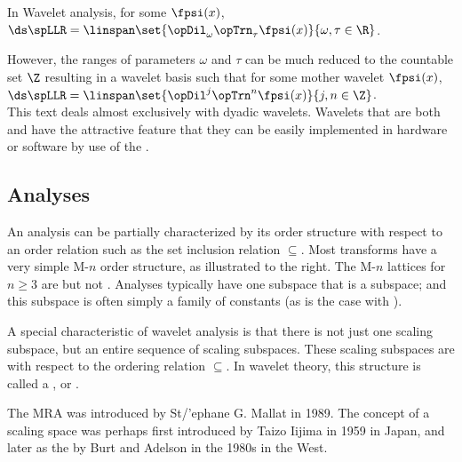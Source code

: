 In Wavelet analysis, for some   $\fpsi(x)$,
  \\\indentx$\ds\spLLR=\linspan\set{\opDil_\omega\opTrn_\tau \fpsi(x)}{\omega,\tau\in\R}$.

However, the ranges of parameters $\omega$ and $\tau$ can be much reduced to the countable set $\Z$ resulting in
a  wavelet basis such that for some mother wavelet $\fpsi(x)$,
  \\\indentx$\ds\spLLR=\linspan\set{\opDil^j\opTrn^n \fpsi(x)}{j,n\in\Z}$.\\
This text deals almost exclusively with dyadic wavelets. 
Wavelets that are both  and  have the attractive feature 
that they can be easily implemented in hardware or software by use of the 
 .

\subsection{Analyses}
    \begin{minipage}{\tw-65mm}%
      An analysis can be partially characterized by its order structure with respect
      to an order relation such as the set inclusion relation $\subseteq$.
      Most transforms have a very simple M-$n$ order structure,
      as illustrated to the right.
      The M-$n$ lattices for $n\ge3$ are  but not .
      Analyses typically have one subspace that is a  subspace;
      and this subspace is often simply a family of constants
      (as is the case with ).
    \end{minipage}%
    \hfill{}%

    \begin{minipage}{\tw-55mm}%
      A special characteristic of wavelet analysis is that there is not just one
      scaling subspace,
      but an entire sequence of scaling subspaces.
      These scaling subspaces are  with respect to the
      ordering relation $\subseteq$. In wavelet theory, this structure is called a ,
      or  .

     The MRA was introduced by St{/'e}phane G. Mallat in 1989.
     The concept of a scaling space was perhaps first introduced by Taizo Iijima in 1959 in Japan,
    and later as the  by Burt and Adelson in the 1980s in the West.\footnotemark
    \end{minipage}%
    \hfill{}%

